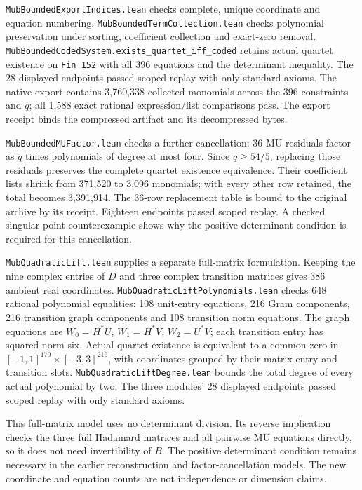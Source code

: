 \documentclass[
]{article}
\begin{document}
\nolinkurl{MubBoundedExportIndices.lean} checks complete, unique
coordinate and equation numbering.
\nolinkurl{MubBoundedTermCollection.lean} checks polynomial preservation
under sorting, coefficient collection and exact-zero removal.
\nolinkurl{MubBoundedCodedSystem.exists_quartet_iff_coded} retains
actual quartet existence on \nolinkurl{Fin 152} with all 396 equations
and the determinant inequality. The 28 displayed endpoints passed scoped
replay with only standard axioms. The native export contains 3,760,338
collected monomials across the 396 constraints and \(q\); all 1,588
exact rational expression/list comparisons pass. The export receipt
binds the compressed artifact and its decompressed bytes.

\nolinkurl{MubBoundedMUFactor.lean} checks a further cancellation: 36 MU
residuals factor as \(q\) times polynomials of degree at most four.
Since \(q\ge54/5\), replacing those residuals preserves the complete
quartet existence equivalence. Their coefficient lists shrink from
371,520 to 3,096 monomials; with every other row retained, the total
becomes 3,391,914. The 36-row replacement table is bound to the original
archive by its receipt. Eighteen endpoints passed scoped replay. A
checked singular-point counterexample shows why the positive determinant
condition is required for this cancellation.

\nolinkurl{MubQuadraticLift.lean} supplies a separate full-matrix
formulation. Keeping the nine complex entries of \(D\) and three complex
transition matrices gives 386 ambient real coordinates.
\nolinkurl{MubQuadraticLiftPolynomials.lean} checks 648 rational
polynomial equalities: 108 unit-entry equations, 216 Gram components,
216 transition graph components and 108 transition norm equations. The
graph equations are \(W_0=H^*U\), \(W_1=H^*V\), \(W_2=U^*V\); each
transition entry has squared norm six. Actual quartet existence is
equivalent to a common zero in \([-1,1]^{170}\times[-3,3]^{216}\), with
coordinates grouped by their matrix-entry and transition slots.
\nolinkurl{MubQuadraticLiftDegree.lean} bounds the total degree of every
actual polynomial by two. The three modules' 28 displayed endpoints
passed scoped replay with only standard axioms.

This full-matrix model uses no determinant division. Its reverse
implication checks the three full Hadamard matrices and all pairwise MU
equations directly, so it does not need invertibility of \(B\). The
positive determinant condition remains necessary in the earlier
reconstruction and factor-cancellation models. The new coordinate and
equation counts are not independence or dimension claims.
\end{document}
